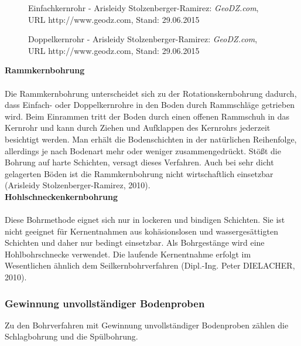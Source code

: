 \documentclass[12pt,a4paper,draft]{scrartcl} %
\begin{document}
  \begin{figure}[H]
    \begin{minipage}{0.4\textwidth}
     \centering
      \caption{Einfachkernrohr - Arisleidy Stolzenberger-Ramirez: \emph{GeoDZ.com}, URL http://www.geodz.com, Stand: 29.06.2015}
    \end{minipage}\hfill
    \begin{minipage}{0.4\textwidth}
     \centering
      \caption{Doppelkernrohr - Arisleidy Stolzenberger-Ramirez: \emph{GeoDZ.com}, URL http://www.geodz.com, Stand: 29.06.2015}
    \end{minipage}
  \end{figure}


\textbf{Rammkernbohrung}\\\\
Die Rammkernbohrung unterscheidet sich zu der Rotationskernbohrung dadurch, dass Einfach- oder Doppelkernrohre in den Boden durch Rammschläge getrieben wird. Beim Einrammen tritt der Boden durch einen offenen Rammschuh in das Kernrohr und kann durch Ziehen und Aufklappen des Kernrohrs jederzeit besichtigt werden. Man erhält die Bodenschichten in der natürlichen Reihenfolge, allerdings je nach Bodenart mehr oder weniger zusammengedrückt. Stößt die Bohrung auf harte Schichten, versagt dieses Verfahren. Auch bei sehr dicht gelagerten Böden ist die Rammkernbohrung nicht wirtschaftlich einsetzbar (Arisleidy Stolzenberger-Ramirez, 2010).\\

\newpage
\textbf{Hohlschneckenkernbohrung}\\\\
Diese Bohrmethode eignet sich nur in lockeren und bindigen Schichten. Sie ist nicht geeignet für Kernentnahmen aus kohäsionslosen und wassergesättigten Schichten und daher nur bedingt einsetzbar. Als Bohrgestänge wird eine Hohlbohrschnecke verwendet. Die laufende Kernentnahme erfolgt im Wesentlichen ähnlich dem Seilkernbohrverfahren (Dipl.-Ing. Peter DIELACHER, 2010). 

\subsubsection{Gewinnung unvollständiger Bodenproben}
Zu den Bohrverfahren mit Gewinnung unvollständiger Bodenproben zählen die Schlagbohrung und die Spülbohrung.\\
\end{document}
